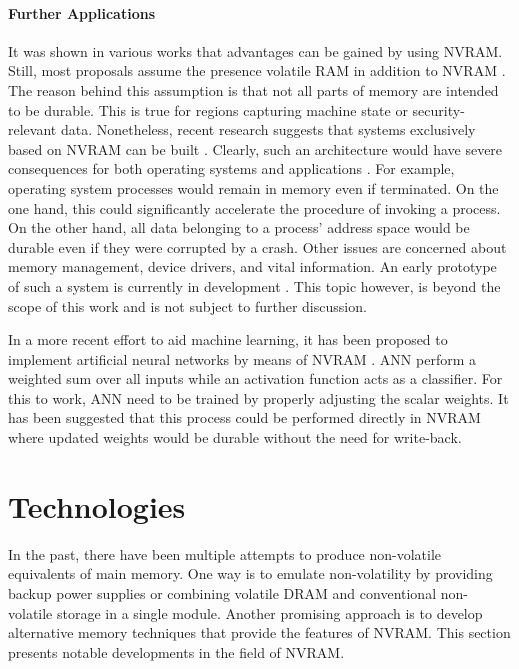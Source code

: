 \paragraph{Further Applications}

It was shown in various works that advantages can be gained by using NVRAM.
Still, most proposals assume the presence volatile RAM in addition to NVRAM
\cite{oukid2017data}. The reason behind this assumption is that not all parts of
memory are intended to be durable. This is true for regions capturing machine
state or security-relevant data. Nonetheless, recent research suggests that
systems exclusively based on NVRAM can be built \cite{narayanan2012whole}.
Clearly, such an architecture would have severe consequences for both operating
systems and applications \cite{bailey2011operating}. For example, operating
system processes would remain in memory even if terminated. On the one hand,
this could significantly accelerate the procedure of invoking a process. On the
other hand, all data belonging to a process' address space would be durable even
if they were corrupted by a crash. Other issues are concerned about memory
management, device drivers, and vital information. An early prototype of such a
system is currently in development \cite{courtland2016can}. This topic however,
is beyond the scope of this work and is not subject to further discussion.

In a more recent effort to aid machine learning, it has been proposed to
implement artificial neural networks by means of NVRAM
\cite{fumarola2016accelerating}. ANN perform a weighted sum over all inputs
while an activation function acts as a classifier. For this to work, ANN need to
be trained by properly adjusting the scalar weights. It has been suggested that
this process could be performed directly in NVRAM where updated weights would be
durable without the need for write-back.

\section{Technologies}

In the past, there have been multiple attempts to produce non-volatile
equivalents of main memory. One way is to emulate non-volatility by providing
backup power supplies or combining volatile DRAM and conventional non-volatile
storage in a single module. Another promising approach is to develop alternative
memory techniques that provide the features of NVRAM. This section presents
notable developments in the field of NVRAM.

